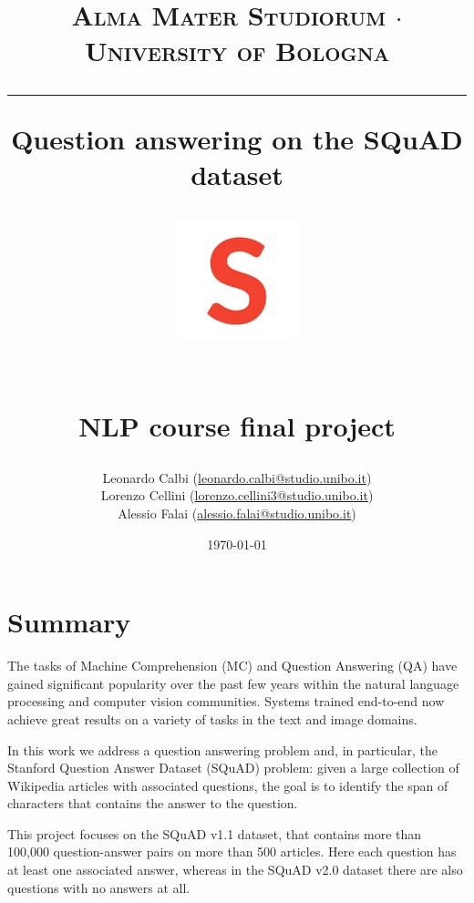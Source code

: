 \documentclass[a4paper,10pt]{report}
\begin{document}
\frenchspacing

\title{
	{{\large{\textsc{Alma Mater Studiorum $\cdot$ University of Bologna}}}}
	\rule{\textwidth}{0.4pt}\vspace{3mm}
	\textbf{Question answering on the SQuAD dataset}
	\begin{figure}[!htb]
		\centering
		\includegraphics[width = 100pt]{squad-logo}
	\end{figure} \\
	NLP course final project
}

\author{Leonardo Calbi (\href{mailto:leonardo.calbi@studio.unibo.it}{leonardo.calbi@studio.unibo.it}) \\ Lorenzo Cellini (\href{mailto:lorenzo.cellini3@studio.unibo.it}{lorenzo.cellini3@studio.unibo.it}) \\ Alessio Falai (\href{mailto:alessio.falai@studio.unibo.it}{alessio.falai@studio.unibo.it})}
\date{\today}
\maketitle
\newpage
\tableofcontents
\setcounter{tocdepth}{1}
\newpage


\chapter{Summary}\label{chap:introduction}

The tasks of Machine Comprehension (MC) and Question Answering (QA) have gained significant popularity over the past few years within the natural language processing and computer vision communities. Systems trained end-to-end now achieve great results on a variety of tasks in the text and image domains.

In this work we address a question answering problem and, in particular, the Stanford Question Answer Dataset (SQuAD) problem: given a large collection of Wikipedia articles with associated questions, the goal is to identify the span of characters that contains the answer to the question.

This project focuses on the SQuAD v1.1 dataset, that contains more than 100,000 question-answer pairs on more than 500 articles. Here each question has at least one associated answer, whereas in the SQuAD v2.0 dataset there are also questions with no answers at all.
\end{document}
